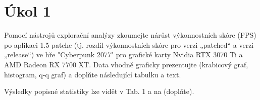 \section*{Úkol 1}
\label{sec:task-1}

Pomocí nástrojů explorační analýzy zkoumejte nárůst výkonnostních skóre (FPS) po aplikaci 1.5 patche 
(tj. rozdíl výkonnostních skóre pro verzi „patched“ a verzi „release“) ve hře "Cyberpunk 2077" pro grafické karty 
Nvidia RTX 3070 Ti a AMD Radeon RX 7700 XT. Data vhodně graficky prezentujte (krabicový graf, histogram, q-q graf) 
a doplňte následující tabulku a text.

\vspace{2em}
\noindent
Výsledky popisné statistiky lze vidět v Tab. 1 a na \TODO (doplňte).

\newcommand{\rangeValues}       {0, 0, 0, 0}
\newcommand{\minValues}         {0, 0, 0, 0}
\newcommand{\QfValues}          {0, 0, 0, 0}
\newcommand{\medianValues}      {0, 0, 0, 0}
\newcommand{\meanValues}        {0, 0, 0, 0}
\newcommand{\QtValues}          {0, 0, 0, 0}
\newcommand{\maxValues}         {0, 0, 0, 0}
\newcommand{\sdValues}          {0, 0, 0, 0}
\newcommand{\cvValues}          {0, 0, 0, 0}
\newcommand{\skewnessValues}    {0, 0, 0, 0}
\newcommand{\kurtosisValues}    {0, 0, 0, 0}
\newcommand{\lowerBoundValues}  {0, 0, 0, 0}
\newcommand{\upperBoundValues}  {0, 0, 0, 0}

\newcommand{\tableValue}[2]{%
    \pgfmathparse{{#1}[#2]}%
    \pgfmathresult%
}

